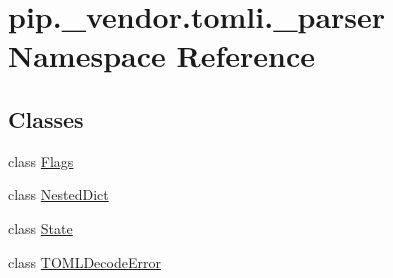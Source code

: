 \hypertarget{namespacepip_1_1__vendor_1_1tomli_1_1__parser}{}\section{pip.\+\_\+vendor.\+tomli.\+\_\+parser Namespace Reference}
\label{namespacepip_1_1__vendor_1_1tomli_1_1__parser}
\subsection*{Classes}
\begin{DoxyCompactItemize}
\item 
class \hyperlink{classpip_1_1__vendor_1_1tomli_1_1__parser_1_1Flags}{Flags}
\item 
class \hyperlink{classpip_1_1__vendor_1_1tomli_1_1__parser_1_1NestedDict}{Nested\+Dict}
\item 
class \hyperlink{classpip_1_1__vendor_1_1tomli_1_1__parser_1_1State}{State}
\item 
class \hyperlink{classpip_1_1__vendor_1_1tomli_1_1__parser_1_1TOMLDecodeError}{T\+O\+M\+L\+Decode\+Error}
\end{DoxyCompactItemize}
